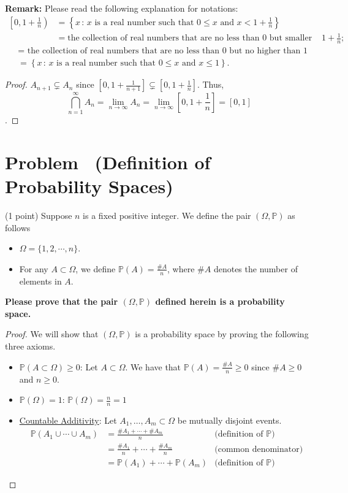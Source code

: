 \documentclass[11pt]{article}
\newcounter{pppp}
\newcommand{\prob}{\arabic{pppp}} %
\newcommand{\increase}{\addtocounter{pppp}{1}} %
\newcommand{\newproblem}[2]{
    \increase
    \section*{Problem \prob~(#1) \hfill {#2}}
}
\newcommand{\p}{\mathbb{P}}
\renewcommand{\to}{\rightarrow}
\begin{document}
\begin{enumerate}
\noindent\textbf{Remark:} Please read the following explanation for notations:
\begin{align*}
\left[0,1+\frac{1}{n}\right)&=\left\{x\,:\, x\mbox{ is a real number such that }0\le x \mbox{ and }x<1+\frac{1}{n}\right\}\\
&= \mbox{the collection of real numbers that are no less than 0 but smaller than }1+\frac{1}{n};
\end{align*}
\begin{align*}
[0,1]&=\mbox{ the collection of real numbers that are no less than 0 but no higher than 1} \\
&=\left\{x\,:\, x\mbox{ is a real number such that }0\le x \mbox{ and }x\le 1\right\}.
\end{align*}
\end{enumerate}

\begin{proof}
  \(A_{n+1}\subsetneq A_n\)
  since \([0,1+\frac{1}{n+1}]\subsetneq [0,1+\frac{1}{n}]\). Thus,
  \[\bigcap_{n=1}^\infty A_n = \lim_{n\to\infty} A_n = \lim_{n\to\infty} [0, 1+\frac{1}{n}] = [0,1]\].
\end{proof}

\newproblem{Definition of Probability Spaces}{}

(1 point) Suppose $n$ is a fixed positive integer. We define the pair $(\Omega,\mathbb{P})$ as follows
\begin{itemize}
\item $\Omega=\{1,2,\cdots,n\}$.
\item For any $A\subset \Omega$, we define $\mathbb{P}(A)=\frac{\# A}{n}$, where $\# A$ denotes the number of elements in $A$.
\end{itemize}
\textbf{Please prove that the pair $(\Omega,\mathbb{P})$ defined herein is a probability space. }

\begin{proof}
  We will show that \((\Omega,\p)\) is a probability space by proving the following three axioms.
  \begin{itemize}
    \item \underline{\(\p(A\subset\Omega)\geq 0\)}: Let \(A\subset \Omega\). We have that \(\p(A)=\frac{\#A}{n}\geq 0\) since
    \(\#A\geq 0\) and \(n\geq 0\).
    \item \underline{\(\p(\Omega)=1  \)}: \(\p(\Omega)=\frac{n}{n}=1\)
    \item \underline{Countable Additivity}: Let \(A_1,\ldots,A_m\subset\Omega\) be mutually disjoint events.
    \begin{align*}
      \p(A_1\cup\cdots\cup A_m) &= \frac{\#A_1+\cdots+\#A_m}{n} & \text{(definition of \(\p\))}\\
      &= \frac{\#A_1}{n}+\cdots+\frac{\#A_m}{n} & \text{(common denominator)}\\
      &= \p(A_1)+\cdots+\p(A_m) & \text{(definition of \(\p\))}
    \end{align*}
  \end{itemize}
\end{proof}
\end{document}
